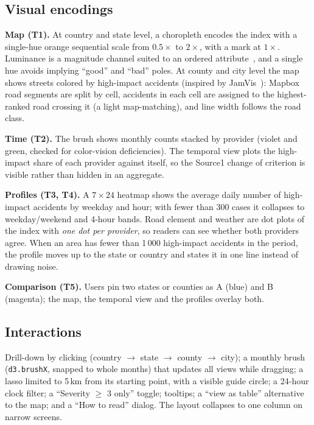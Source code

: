 \documentclass[conference]{IEEEtran}
\begin{document}
\subsection{Visual encodings}
\textbf{Map (T1).} At country and state level, a choropleth encodes the index with a single-hue orange sequential scale from $0.5\times$ to $2\times$, with a mark at $1\times$. Luminance is a magnitude channel suited to an ordered attribute~\cite{munzner2014visualization}, and a single hue avoids implying ``good'' and ``bad'' poles. At county and city level the map shows streets colored by high-impact accidents (inspired by JamVis~\cite{rodriguez2022jamvis}): Mapbox road segments are split by cell, accidents in each cell are assigned to the highest-ranked road crossing it (a light map-matching), and line width follows the road class.

\textbf{Time (T2).} The brush shows monthly counts stacked by provider (violet and green, checked for color-vision deficiencies). The temporal view plots the high-impact share of each provider against itself, so the Source1 change of criterion is visible rather than hidden in an aggregate.

\textbf{Profiles (T3, T4).} A $7\times24$ heatmap shows the average daily number of high-impact accidents by weekday and hour; with fewer than 300 cases it collapses to weekday/weekend and 4-hour bands. Road element and weather are dot plots of the index with \emph{one dot per provider}, so readers can see whether both providers agree. When an area has fewer than 1\,000 high-impact accidents in the period, the profile moves up to the state or country and states it in one line instead of drawing noise.

\textbf{Comparison (T5).} Users pin two states or counties as A (blue) and B (magenta); the map, the temporal view and the profiles overlay both.

\subsection{Interactions}
Drill-down by clicking (country $\rightarrow$ state $\rightarrow$ county $\rightarrow$ city); a monthly brush (\texttt{d3.brushX}, snapped to whole months) that updates all views while dragging; a lasso limited to 5\,km from its starting point, with a visible guide circle; a 24-hour clock filter; a ``Severity $\geq$ 3 only'' toggle; tooltips; a ``view as table'' alternative to the map; and a ``How to read'' dialog. The layout collapses to one column on narrow screens.
\end{document}
